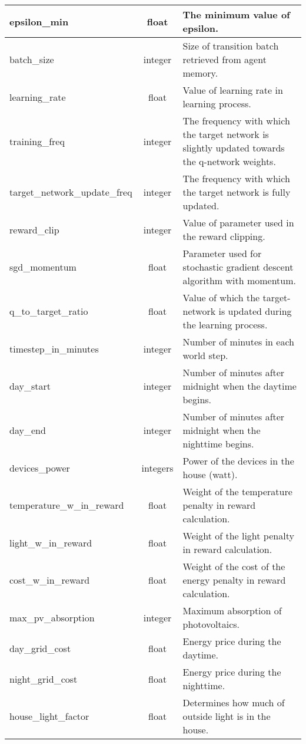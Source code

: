\documentclass{article}
\begin{document}
\begin{longtable}{l|c|p{9cm}}
    \hline
    epsilon\_min & float & The minimum value of epsilon.\\
    \hline
    batch\_size & integer & Size of transition batch retrieved from agent memory.\\
    \hline
    learning\_rate & float & Value of learning rate in learning process.\\
    \hline
    training\_freq & integer & The frequency with which the target network is slightly updated towards the q-network weights.\\
    \hline
    target\_network\_update\_freq & integer & The frequency with which the target network is fully updated.\\
    \hline
    reward\_clip & integer & Value of parameter used in the reward clipping.\\
    \hline
    sgd\_momentum & float & Parameter used for stochastic gradient descent algorithm with momentum.\\
    \hline
    q\_to\_target\_ratio & float & Value of which the target-network is updated during the learning process.\\
    \hline
    timestep\_in\_minutes & integer & Number of minutes in each world step.\\
    \hline
    day\_start & integer & Number of minutes after midnight when the daytime begins.\\
    \hline
    day\_end & integer & Number of minutes after midnight when the nighttime begins.\\
    \hline
    devices\_power & integers & Power of the devices in the house (watt).\\
    \hline
    temperature\_w\_in\_reward & float & Weight of the temperature penalty in reward calculation.\\
    \hline
    light\_w\_in\_reward & float & Weight of the light penalty in reward calculation.\\
    \hline
    cost\_w\_in\_reward & float & Weight of the cost of the energy penalty in reward calculation.\\
    \hline
    max\_pv\_absorption & integer & Maximum absorption of photovoltaics.\\
    \hline
    day\_grid\_cost & float & Energy price during the daytime.\\
    \hline
    night\_grid\_cost & float & Energy price during the nighttime.\\
    \hline
    house\_light\_factor & float & Determines how much of outside light is in the house.\\

\end{longtable}
\end{document}

